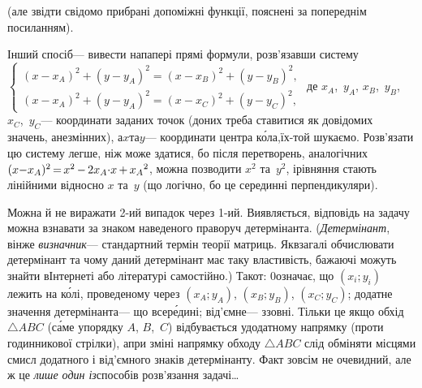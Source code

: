 \documentclass[14pt,a4paper]{extarticle}
\def\dib#1{\,#1\discretionary{}{\mbox{$#1$}}{}\,}
\begin{document}
 (але звідти свідомо прибрані допоміжні функції, пояснені за попереднім посиланням).

Інший спосіб\nolinebreak[3] --- вивести на\nolinebreak[3] папері прямі формули, розв'язавши систему
$\left\{
\begin{array}{c}
(x{-}x_A)^2+(y{-}y_A)^2 = (x{-}x_B)^2+(y{-}y_B)^2,\\
(x{-}x_A)^2+(y{-}y_A)^2 = (x{-}x_C)^2+(y{-}y_C)^2,
\end{array}
\right.$
де $x_A$,~$y_A$, $x_B$,~$y_B$, $x_C$,~$y_C$\nolinebreak[3] --- коор\-ди\-нати заданих точок (до\nolinebreak[3] них треба ставитися як до\nolinebreak[3] відомих значень, а\nolinebreak[3] не\nolinebreak[3] змінних), а\nolinebreak[3] $x$\nolinebreak[1] та\nolinebreak[3] $y$\nolinebreak[3] --- координати центра к\'{о}ла,\linebreak[1] їх-то\nolinebreak[1] й шукаємо. Розв'язати цю систему легше, ніж може здатися, бо після перетворень, аналогічних ${(x{-}x_A)^2}\dib{{=}}x^2\dib{{-}}2x_A{\cdot}x\dib{{+}}{x_A}^2$, можна позводити $x^2$ та~$y^2$, і\nolinebreak[3] рівняння стають лінійними відносно $x$ та~$y$ (що логічно, бо це серединні перпендикуляри).

Можна й не виражати \mbox{2-ий} випадок через \mbox{1-ий}. Виявляється, відповідь на задачу можна взнавати за знаком наведеного праворуч детермінанта. (\emph{Детермінант}, він\nolinebreak[3] же \emph{визначник}\nolinebreak[3] --- стандартний термін теорії матриць. Як\nolinebreak[3] взагалі обчислювати детермінант та чому даний детермінант має таку властивість, бажаючі можуть знайти в\nolinebreak[3] Інтернеті або літературі самостійно.) Так\nolinebreak[3] от: 0\nolinebreak[3] означає, що ${(x_i;y_i)}$ лежить на к\'{о}лі, проведеному через ${(x_A;y_A)}$, ${(x_B;y_B)}$, ${(x_C;y_C)}$; додатне значення детермінанта\nolinebreak[3] --- що всер\'{е}дині; від'ємне\nolinebreak[3] --- ззовні. Тільки це якщо обхід $\triangle{}ABC$ (с\'{а}ме у\nolinebreak[3] порядку $A$, $B$,~$C$) відбувається у\nolinebreak[3] додатному напрямку (проти годинникової стрілки), а\nolinebreak[3] при зміні напрямку обходу $\triangle{}ABC$ слід обміняти місцями смисл додатного і від'ємного знаків детермінанту. Факт зовсім не очевидний, але ж це \emph{лише один із}\nolinebreak[3] способів розв'язання задачі\dots
\end{document}
